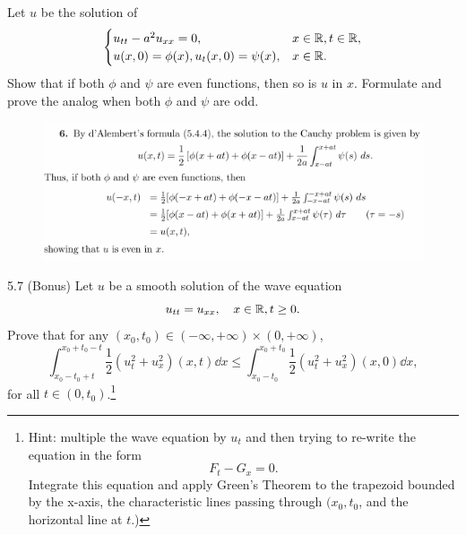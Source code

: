 \begin{question}{5.6}{}
    Let $u$ be the solution of
    \[
        \begin{cases}
            u_{tt} - a^2u_{xx} = 0, & x\in\mathbb{R}, t\in\mathbb{R}, \\
            u(x,0)=\phi(x), u_t(x,0)=\psi(x), & x\in\mathbb{R}. \\
        \end{cases}
    \]
    Show that if both $\phi$ and $\psi$ are even functions, then so is $u$ in $x$. Formulate and prove the analog when both $\phi$ and $\psi$ are odd.
\end{question}
\begin{figure}[H]
    \includegraphics[width=.9\textwidth]{figures/5.6-1.png}
\end{figure}


\begin{question}{5.7 (Bonus) }{}
    Let $u$ be a smooth solution of the wave equation
    \[
        u_{tt} = u_{xx},\quad x\in\mathbb{R}, t\geq 0.
    \]
    Prove that for any $(x_0,t_0)\in(-\infty,+\infty)\times(0,+\infty)$,
    \[
        \int_{x_0-t_0+t}^{x_0+t_0-t}\frac{1}{2}(u_t^2+u_x^2)(x,t)\dd x \leq \int_{x_0-t_0}^{x_0+t_0}\frac{1}{2}(u_t^2+u_x^2)(x,0)\dd x,
    \]
    for all $t\in(0, t_0)$.\footnote{Hint: multiple the wave equation by $u_t$ and then trying to re-write the equation in the form\[F_t-G_x=0.\] Integrate this equation and apply Green's Theorem to the trapezoid bounded by the x-axis, the characteristic lines passing through $(x_0,t_0$, and the horizontal line at $t$.)}
\end{question}
